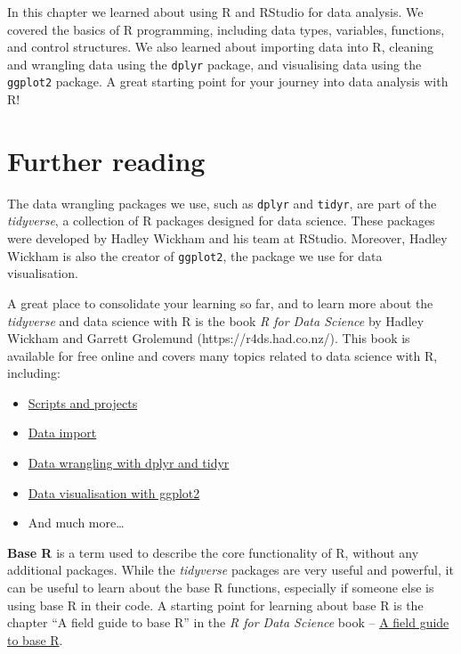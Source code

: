 \documentclass[
  letterpaper,
  8pt,
  a4paper]{book}
\providecommand{\tightlist}{%
  \setlength{\itemsep}{0pt}\setlength{\parskip}{0pt}}
\begin{document}

In this chapter we learned about using R and RStudio for data analysis.
We covered the basics of R programming, including data types, variables,
functions, and control structures. We also learned about importing data
into R, cleaning and wrangling data using the \texttt{dplyr} package,
and visualising data using the \texttt{ggplot2} package. A great
starting point for your journey into data analysis with R!

\section*{Further reading}\label{further-reading}


The data wrangling packages we use, such as \texttt{dplyr} and
\texttt{tidyr}, are part of the \emph{tidyverse}, a collection of R
packages designed for data science. These packages were developed by
Hadley Wickham and his team at RStudio. Moreover, Hadley Wickham is also
the creator of \texttt{ggplot2}, the package we use for data
visualisation.

A great place to consolidate your learning so far, and to learn more
about the \emph{tidyverse} and data science with R is the book \emph{R
for Data Science} by Hadley Wickham and Garrett Grolemund
(https://r4ds.had.co.nz/). This book is available for free online and
covers many topics related to data science with R, including:

\begin{itemize}
\tightlist
\item
  \href{https://r4ds.hadley.nz/workflow-scripts.html}{Scripts and
  projects}
\item
  \href{https://r4ds.hadley.nz/data-import.html}{Data import}
\item
  \href{https://r4ds.hadley.nz/data-transform.html}{Data wrangling with
  dplyr and tidyr}
\item
  \href{https://r4ds.hadley.nz/data-visualize.html}{Data visualisation
  with ggplot2}
\item
  And much more\ldots{}
\end{itemize}

\textbf{Base R} is a term used to describe the core functionality of R,
without any additional packages. While the \emph{tidyverse} packages are
very useful and powerful, it can be useful to learn about the base R
functions, especially if someone else is using base R in their code. A
starting point for learning about base R is the chapter ``A field guide
to base R'' in the \emph{R for Data Science} book --
\href{https://r4ds.hadley.nz/base-R.html}{A field guide to base R}.
\end{document}
